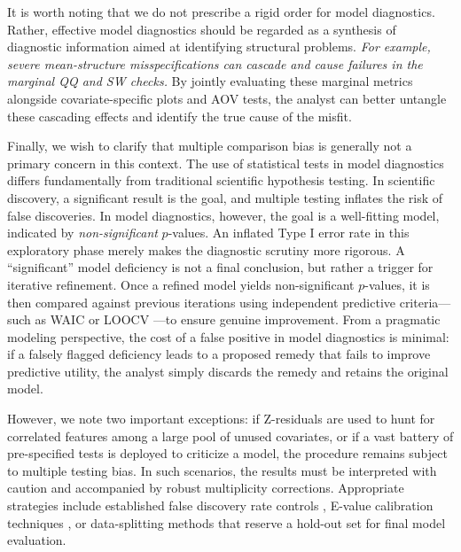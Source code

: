 It is worth noting that we do not prescribe a rigid order for model diagnostics. Rather, effective model diagnostics should be regarded as a synthesis of diagnostic information aimed at identifying structural problems. \textit{For example, severe mean-structure misspecifications can cascade and cause failures in the \textit{marginal} QQ and SW checks.} By jointly evaluating these marginal metrics alongside covariate-specific plots and AOV tests, the analyst can better untangle these cascading effects and identify the true  cause of the misfit.

Finally, we wish to clarify that multiple comparison bias is generally not a primary concern in this context. The use of statistical tests in model diagnostics differs fundamentally from traditional scientific hypothesis testing. In scientific discovery, a significant result is the goal, and multiple testing inflates the risk of false discoveries. In model diagnostics, however, the goal is a well-fitting model, indicated by \textit{non-significant} $p$-values. An inflated Type I error rate in this exploratory phase merely makes the diagnostic scrutiny more rigorous. A ``significant'' model deficiency is not a final conclusion, but rather a trigger for iterative refinement. Once a refined model yields non-significant $p$-values, it is then compared against previous iterations using independent predictive criteria—such as WAIC or LOOCV \citep{Vehtari2017}—to ensure genuine improvement. From a pragmatic modeling perspective, the cost of a false positive in model diagnostics is minimal: if a falsely flagged deficiency leads to a proposed remedy that fails to improve predictive utility, the analyst simply discards the remedy and retains the original model.

However, we note two important exceptions: if Z-residuals are used to hunt for correlated features among a large pool of unused covariates, or if a vast battery of pre-specified tests is deployed to criticize a model, the procedure remains subject to multiple testing bias. In such scenarios, the results must be interpreted with caution and accompanied by robust multiplicity corrections. Appropriate strategies include established false discovery rate controls \citep{Benjamini1995}, E-value calibration techniques \citep{VovkVladimir2021ECCA, RamdasAaditya2023GSaS}, or data-splitting methods that reserve a hold-out set for final model evaluation.

\subsection{}\label{sec:ppczresid}


